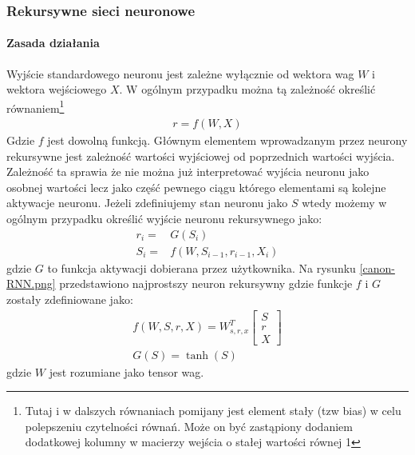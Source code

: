 \subsubsection{Rekursywne sieci neuronowe}
\paragraph{Zasada działania}
Wyjście standardowego neuronu jest zależne wyłącznie od wektora wag $W$ i wektora wejściowego $X$. W ogólnym przypadku można tą zależność określić równaniem\footnote{Tutaj i w dalszych równaniach pomijany jest element stały (tzw bias) w celu polepszeniu czytelności równań. Może on być zastąpiony dodaniem dodatkowej kolumny w macierzy wejścia o stałej wartości równej 1} 
\begin{align*}
    \label{eqn:basic-neuron}
    r = f(W,X)
\end{align*}
Gdzie $f$ jest dowolną funkcją. \cite[p.~5]{nn-basic}
Głównym elementem wprowadzanym przez neurony rekursywne jest zależność wartości wyjściowej od poprzednich wartości wyjścia. Zależność ta sprawia że nie można już interpretować wyjścia neuronu jako osobnej wartości lecz jako część pewnego ciągu którego elementami są kolejne aktywacje neuronu. \cite[p.~7]{LSTM-intro} Jeżeli zdefiniujemy stan neuronu jako $S$ wtedy możemy w ogólnym przypadku określić wyjście neuronu rekursywnego jako:
\begin{align*}
    \label{eqn:rnn-neuron}
    r_i =& G(S_i) \\
    S_i =& f(W,S_{i-1},r_{i-1},X_i)
\end{align*}
gdzie $G$ to funkcja aktywacji dobierana przez użytkownika.
Na rysunku \ref{canon-RNN.png} przedstawiono najprostszy neuron rekursywny gdzie funkcje $f$ i $G$ zostały zdefiniowane jako:
\begin{align*}
    \label{eqn:rnn-neuron-canon}
    f(W,S,r,X) = W^T_{s,r,x}\begin{bmatrix} S \\ r \\ X \end{bmatrix} \\
    G(S) = \tanh(S)
\end{align*}
gdzie $W$ jest rozumiane jako tensor wag.
